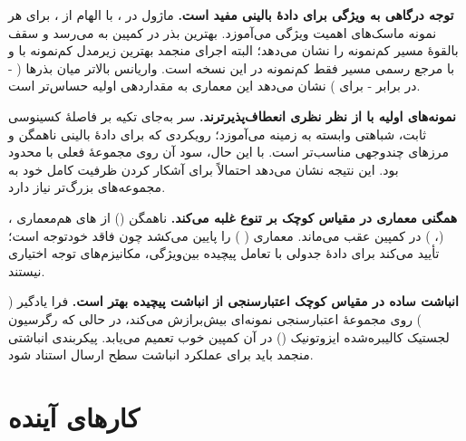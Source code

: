 \textbf{توجه درگاهی به ویژگی برای دادۀ بالینی مفید است.} ماژول  در ، با الهام از ، برای هر نمونه ماسک‌های اهمیت ویژگی می‌آموزد. بهترین بذر  در کمپین  به   می‌رسد و سقف بالقوۀ مسیر کم‌نمونه را نشان می‌دهد؛ البته اجرای منجمد بهترین زیرمدل کم‌نمونه با  و  با  \textbf{} مرجع رسمی مسیر فقط کم‌نمونه در این نسخه است. واریانس بالاتر میان بذرها ( - در برابر - برای ) نشان می‌دهد این معماری به مقداردهی اولیه حساس‌تر است.

\textbf{نمونه‌های اولیه با  از نظر نظری انعطاف‌پذیرترند.} سر  به‌جای تکیه بر فاصلۀ کسینوسی ثابت، شباهتی وابسته به زمینه می‌آموزد؛ رویکردی که برای دادۀ بالینی ناهمگن و مرزهای چندوجهی مناسب‌تر است. با این حال، سود آن روی مجموعۀ فعلی با  محدود بود. این نتیجه نشان می‌دهد  احتمالاً برای آشکار کردن ظرفیت کامل خود به مجموعه‌های بزرگ‌تر نیاز دارد.

\textbf{همگنی معماری در مقیاس کوچک بر تنوع غلبه می‌کند.}  ناهمگن  () از های هم‌معماری ،  (، ) در کمپین  عقب می‌ماند. معماری  ( )  را پایین می‌کشد چون فاقد خودتوجه است؛ تأیید می‌کند برای دادۀ جدولی با تعامل پیچیده بین‌ویژگی، مکانیزم‌های توجه اختیاری نیستند.

\textbf{انباشت ساده در مقیاس کوچک اعتبارسنجی از انباشت پیچیده بهتر است.} فرا یادگیر   ( ) روی مجموعۀ اعتبارسنجی نمونه‌ای بیش‌برازش می‌کند، در حالی که رگرسیون لجستیک کالیبره‌شده ایزوتونیک  () در آن کمپین خوب تعمیم می‌یابد. پیکربندی انباشتی منجمد \texttt{} باید برای عملکرد انباشت سطح ارسال استناد شود.

\section{کارهای آینده}

